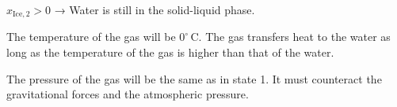 \( x_{\text{Ice},2} > 0 \) → Water is still in the solid-liquid phase.  

The temperature of the gas will be \( 0^\circ \, \text{C} \). The gas transfers heat to the water as long as the temperature of the gas is higher than that of the water.  

The pressure of the gas will be the same as in state 1. It must counteract the gravitational forces and the atmospheric pressure.